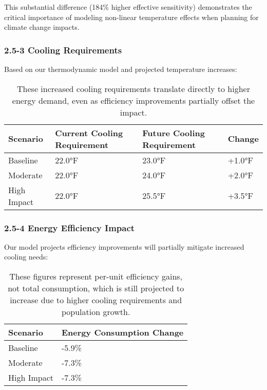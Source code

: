 \documentclass{article}
\begin{document}
This substantial difference (184\% higher effective sensitivity) demonstrates the critical importance of modeling non-linear temperature effects when planning for climate change impacts.

\subsubsection*{2.5-3 Cooling Requirements}
Based on our thermodynamic model and projected temperature increases:
\begin{table}[h]
\centering

\begin{tabular}{| l | l | l | l |}
\hline
Scenario & Current Cooling Requirement & Future Cooling Requirement & Change \\
\hline
Baseline & 22.0°F & 23.0°F & +1.0°F \\
\hline
Moderate & 22.0°F & 24.0°F & +2.0°F \\
\hline
High Impact & 22.0°F & 25.5°F & +3.5°F \\
\hline

\end{tabular}
\caption{These increased cooling requirements translate directly to higher energy demand, even as efficiency improvements partially offset the impact.}
\label{tab:my_table}
\end{table}

\subsubsection*{2.5-4 Energy Efficiency Impact}
Our model projects efficiency improvements will partially mitigate increased cooling needs:
\begin{table}
\centering

\begin{tabular}{| l | l |}
\hline
Scenario & Energy Consumption Change \\
\hline
Baseline & -5.9\% \\
\hline
Moderate & -7.3\% \\
\hline
High Impact & -7.3\% \\
\hline

\end{tabular}
\caption{These figures represent per-unit efficiency gains, not total consumption, which is still projected to increase due to higher cooling requirements and population growth.}
\label{tab:my_table}
\end{table}
\end{document}
